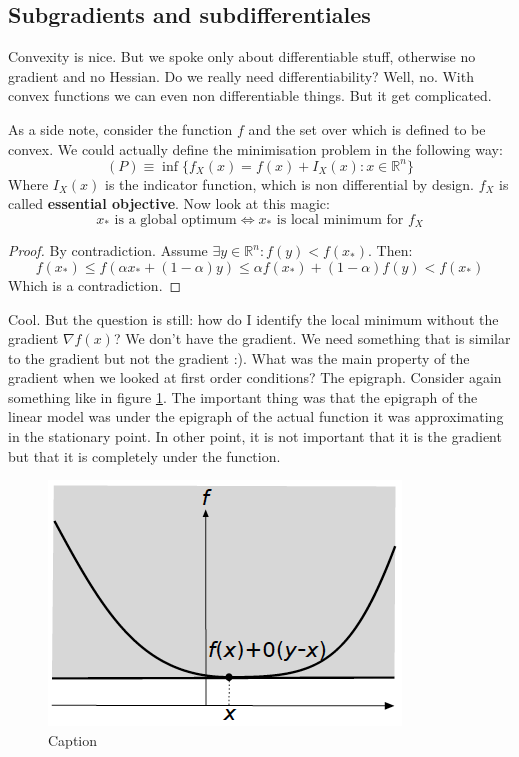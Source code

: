 \subsection{Subgradients and subdifferentiales}
\par Convexity is nice. But we spoke only about differentiable stuff, otherwise no gradient and no Hessian. Do we really need differentiability? Well, no. With convex functions we can even non differentiable things. But it get complicated.
\par As a side note, consider the function $f$ and the set over which is defined to be convex. We could actually define the minimisation problem in the following way:
\begin{equation}
    (P) \equiv \inf\{f_X(x) = f(x) + I_X(x) : x \in \mathbb{R}^n\}
\end{equation}
Where $I_X(x)$ is the indicator function, which is non differential by design. $f_X$ is called \textbf{essential objective}. Now look at this magic:
\begin{equation}
    x_* \mbox{ is a global optimum} \iff x_* \mbox{ is local minimum for } f_X
\end{equation}
\begin{proof}
    By contradiction. Assume $\exists y \in \mathbb{R}^n : f(y) < f(x_*)$. Then:
    \[
        f(x_*) \leq f(\alpha x_* + (1-\alpha) y) \leq \alpha f(x_*) + (1 - \alpha) f(y) < f(x_*)
    \]
    Which is a contradiction.
\end{proof}
\par Cool. But the question is still: how do I identify the local minimum without the gradient $\nabla f(x)$? We don't have the gradient. We need something that is similar to the gradient but not the gradient :). What was the main property of the gradient when we looked at first order conditions? The epigraph. Consider again something like in figure \ref{fig:chapter2-foc9}. The important thing was that the epigraph of the linear model was under the epigraph of the actual function it was approximating in the stationary point. In other point, it is not important that it is the gradient but that it is completely under the function.
\begin{figure}
    \centering
    \includegraphics[scale=0.4]{figures/2/first-order-convex/9.png}
    \caption{Caption}
    \label{fig:chapter2-foc9}
\end{figure}
